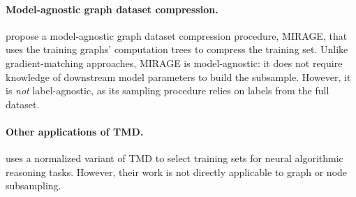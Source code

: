 \paragraph{Model-agnostic graph dataset compression.} \citet{mirage} propose a model-agnostic graph dataset compression procedure, MIRAGE, that uses the training graphs' computation trees to compress the training set. Unlike gradient-matching approaches, MIRAGE is model-agnostic: it does not require knowledge of downstream model parameters to build the subsample. However, it is \emph{not} label-agnostic, as its sampling procedure relies on labels from the full dataset.



\paragraph{Other applications of TMD.} \citet{georgiev23} uses a normalized variant of TMD to select training sets for neural algorithmic reasoning tasks. However, their work is not directly applicable to graph or node subsampling.